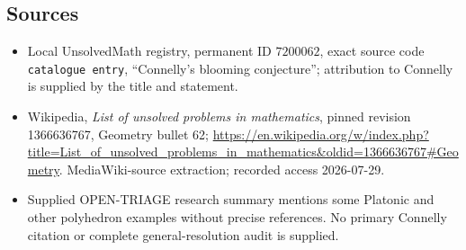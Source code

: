 \documentclass[11pt]{article}
\begin{document}
\subsection{Sources}
\begin{itemize}
\item Local UnsolvedMath registry, permanent ID \(7200062\), exact source code \texttt{catalogue entry}, ``Connelly's blooming conjecture''; attribution to Connelly is supplied by the title and statement.
\item Wikipedia, \emph{List of unsolved problems in mathematics}, pinned revision 1366636767, Geometry bullet 62; \url{https://en.wikipedia.org/w/index.php?title=List_of_unsolved_problems_in_mathematics&oldid=1366636767#Geometry}. MediaWiki-source extraction; recorded access 2026-07-29.
\item Supplied OPEN-TRIAGE research summary mentions some Platonic and other polyhedron examples without precise references. No primary Connelly citation or complete general-resolution audit is supplied.
\end{itemize}
\end{document}
